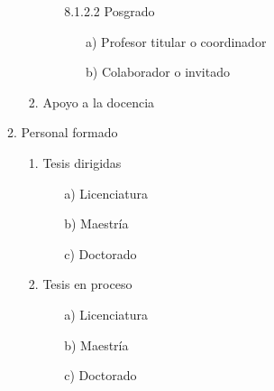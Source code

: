 \documentclass[12pt]{report}
\begin{document}
\begin{enumerate}
\begin{enumerate}
\begin{enumerate}
\begin{enumerate}
        			\item [8.1.2.2]Posgrado
        				\begin{itemize}
        				\item[a)] Profesor titular o coordinador
        				\item[b)] Colaborador o invitado
        				\end{itemize}
        			\end{enumerate}
        	    \item Apoyo a la docencia

        		\end{enumerate}

        	\item Personal formado
        		\begin{enumerate}
        		\item Tesis dirigidas
        			\begin{itemize}
        			\item[a)] Licenciatura
        			\item[b)] Maestría
        			\item[c)] Doctorado
        			\end{itemize}
                \item Tesis en proceso
                	\begin{itemize}
        			\item[a)] Licenciatura
        			\item[b)] Maestría
        			\item[c)] Doctorado
        			\end{itemize}


\end{enumerate}
\end{enumerate}
\end{enumerate}
\end{document}
